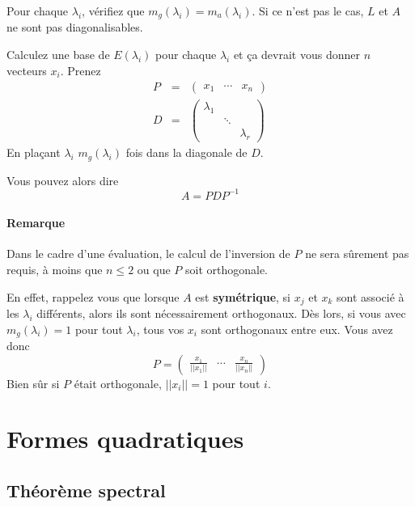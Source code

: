 \documentclass[11pt,a4paper]{article}
\theoremstyle{definition}
\begin{document}
Pour chaque $\lambda_i$, vérifiez que $m_g(\lambda_i) = m_a(\lambda_i)$. Si ce n'est pas le cas, $L$ et $A$ ne sont pas diagonalisables.

Calculez une base de $E(\lambda_i)$ pour chaque $\lambda_i$ et ça devrait vous donner $n$ vecteurs $x_i$.
Prenez
\begin{eqnarray*}
	P &=& \begin{pmatrix}x_1 & \cdots & x_n\end{pmatrix}\\
	D &=&
	\begin{pmatrix}
		\lambda_1 & &\\
		&\ddots&\\
		&&\lambda_r
	\end{pmatrix}
\end{eqnarray*}
En plaçant $\lambda_i$ $m_g(\lambda_i)$ fois dans la diagonale de $D$.

Vous pouvez alors dire
\[ A = PDP^{-1} \]

\paragraph{Remarque}
Dans le cadre d'une évaluation, le calcul de l'inversion de $P$ ne sera sûrement pas requis, à moins que $n \leq 2$ ou que $P$ soit orthogonale.

En effet, rappelez vous que lorsque $A$ est \textbf{symétrique}, si $x_j$ et $x_k$ sont associé à les $\lambda_i$ différents, alors ils sont nécessairement orthogonaux.
Dès lors, si vous avec $m_g(\lambda_i) = 1$ pour tout $\lambda_i$, tous vos $x_i$ sont orthogonaux entre eux.
Vous avez donc
\[
P =
\begin{pmatrix}
	\frac{x_1}{||x_1||} & \cdots & \frac{x_n}{||x_n||}
\end{pmatrix}
\]
Bien sûr si $P$ était orthogonale, $||x_i|| = 1$ pour tout $i$.


\section{Formes quadratiques}

\subsection{Théorème spectral}
\end{document}

